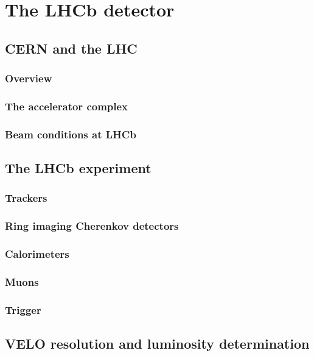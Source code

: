 \chapter{The LHCb detector} 
\label{ch:detector}
\minitoc
 


\section{CERN and the LHC}

\subsection{Overview}
\subsection{The accelerator complex}
\subsection{Beam conditions at LHCb}

\section{The LHCb experiment}

\subsection{Trackers}
\subsection{Ring imaging Cherenkov detectors}
\subsection{Calorimeters}
\subsection{Muons}
\subsection{Trigger}

\section{VELO resolution and luminosity determination}